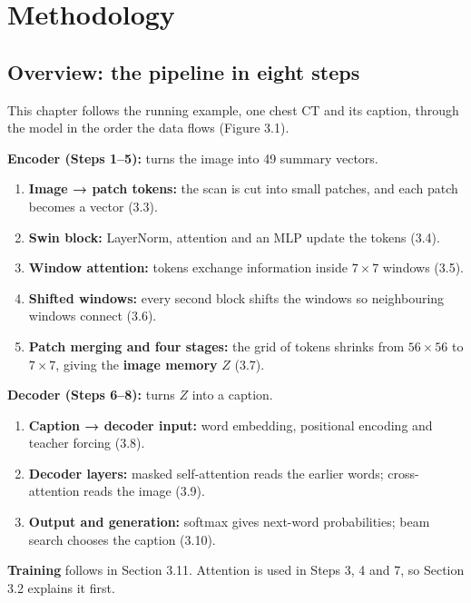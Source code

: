 \chapter{Methodology}

\section{Overview: the pipeline in eight steps}

This chapter follows the running example, one chest CT and its caption, through the model in the order the data flows (Figure 3.1).

\textbf{Encoder (Steps 1--5):} turns the image into 49 summary vectors.

\begin{enumerate}
\def\labelenumi{\arabic{enumi}.}
\tightlist
\item
  \textbf{Image → patch tokens:} the scan is cut into small patches, and each patch becomes a vector (3.3).
\item
  \textbf{Swin block:} LayerNorm, attention and an MLP update the tokens (3.4).
\item
  \textbf{Window attention:} tokens exchange information inside \(7 \times 7\) windows (3.5).
\item
  \textbf{Shifted windows:} every second block shifts the windows so neighbouring windows connect (3.6).
\item
  \textbf{Patch merging and four stages:} the grid of tokens shrinks from \(56 \times 56\) to \(7 \times 7\), giving the \textbf{image memory} \(Z\) (3.7).
\end{enumerate}

\textbf{Decoder (Steps 6--8):} turns \(Z\) into a caption.

\begin{enumerate}
\def\labelenumi{\arabic{enumi}.}
\setcounter{enumi}{5}
\tightlist
\item
  \textbf{Caption → decoder input:} word embedding, positional encoding and teacher forcing (3.8).
\item
  \textbf{Decoder layers:} masked self-attention reads the earlier words; cross-attention reads the image (3.9).
\item
  \textbf{Output and generation:} softmax gives next-word probabilities; beam search chooses the caption (3.10).
\end{enumerate}

\textbf{Training} follows in Section 3.11. Attention is used in Steps 3, 4 and 7, so Section 3.2 explains it first.

